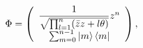 \begin{equation}
\Phi=\left(
\begin{array}
[c]{c}%
\dfrac{1}{\sqrt{\prod_{l=1}^{n}(\bar{z}z+l\theta)}}z^{n}\\
\sum_{m=0}^{n-1}\left\vert m\right\rangle \left\langle m\right\vert
\end{array}
\right) , \label{phi2}%
\end{equation}

